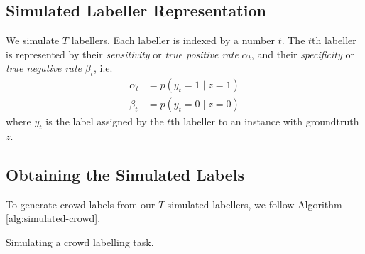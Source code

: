     \subsection{Simulated Labeller Representation}
    \label{sec:simulated-labellers}

        We simulate $T$ labellers. Each labeller is indexed by a number $t$. The
        $t$th labeller is represented by their \emph{sensitivity} or \emph{true
        positive rate} $\alpha_t$, and their \emph{specificity} or \emph{true
        negative rate} $\beta_t$, i.e.
        \begin{align*}
            \alpha_t &= p(y_t = 1 \mid z = 1)\\
            \beta_t &= p(y_t = 0 \mid z = 0)
        \end{align*}
        where $y_t$ is the label assigned by the $t$th labeller to an instance
        with groundtruth $z$.

    \subsection{Obtaining the Simulated Labels}
    \label{sec:obtaining-simulated-labels}

        To generate crowd labels from our $T$ simulated labellers, we follow Algorithm \ref{alg:simulated-crowd}.

        \begin{algorithm}[H]

            \caption{Simulating a crowd labelling task.}
            \label{alg:simulated-crowd}
        \end{algorithm}

